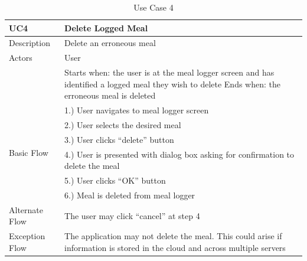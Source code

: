 \documentclass{article}
\begin{document}
\begin{appendicies}
\begin{table}[!htbp]
\centering
\hspace*{-0.5cm}
\begin{tabular}{||m{6cm}|m{6cm}||}
    \hline
    UC4 & Delete Logged Meal\\
    \hline
    Description & Delete an erroneous meal\\
    \hline
    Actors & User\\
    \hline
    & Starts when: the user is at the meal logger screen and has identified a logged meal they wish to delete \newline
    Ends when: the erroneous meal is deleted\\
    \hline
    \multirow{6}{\hsize}{Basic Flow} 
                                    & 1.) User navigates to meal logger screen\\
                                    & 2.) User selects the desired meal\\ 
                                    & 3.) User clicks “delete” button\\
                                    & 4.) User is presented with dialog box asking for confirmation to delete the meal\\
                                    & 5.) User clicks “OK” button \\
                                    & 6.) Meal is deleted from meal logger\\
    \hline
    Alternate Flow & The user may click “cancel” at step 4\\
    \hline 
    Exception Flow & The application may not delete the meal. This could arise if information is stored in the cloud and across multiple servers\\
\hline
\end{tabular}
\caption{Use Case 4}
\label{table:UC4}
\end{table}


\end{appendicies}
\end{document}
